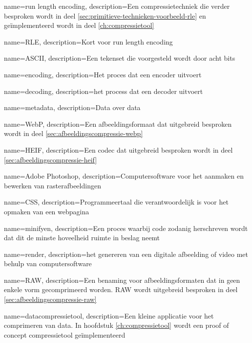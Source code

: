 {
	name={run length encoding},
	description={Een compressietechniek die verder besproken wordt in deel \ref{sec:primitieve-technieken-voorbeeld-rle} en geïmplementeerd wordt in deel \ref{ch:compressietool}}
}

{
	name={RLE},
	description={Kort voor run length encoding}
}

{
	name={ASCII},
	description={Een tekenset die voorgesteld wordt door acht bits}
}

{
	name={encoding},
	description={Het proces dat een encoder uitvoert}
}

{
	name={decoding},
	description={het process dat een decoder uitvoert}
}

{
	name={metadata},
	description={Data over data}
}

{
	name={WebP},
	description={Een afbeeldingsformaat dat uitgebreid besproken wordt in deel \ref{sec:afbeeldingscompressie-webp}}
}

{
	name={HEIF},
	description={Een codec dat uitgebreid besproken wordt in deel \ref{sec:afbeeldingscompressie-heif}}
}

{
	name={Adobe Photoshop},
	description={Computersoftware voor het aanmaken en bewerken van rasterafbeeldingen}
}

{
	name={CSS},
	description={Programmeertaal die verantwoordelijk is voor het opmaken van een webpagina}
}

{
	name={minifyen},
	description={Een proces waarbij code zodanig herschreven wordt dat dit de minste hoveelheid ruimte in beslag neemt}
}

{
	name={render},
	description={het genereren van een digitale afbeelding of video met behulp van computersoftware}
}

{
	name={RAW},
	description={Een benaming voor afbeeldingsformaten dat in geen enkele vorm gecomprimeerd worden. RAW wordt uitgebreid besproken in deel \ref{sec:afbeeldingscompressie-raw}}
}

{
	name={datacompressietool},
	description={Een kleine applicatie voor het comprimeren van data. In hoofdstuk \ref{ch:compressietool} wordt een proof of concept compressietool geïmplementeerd}
}

